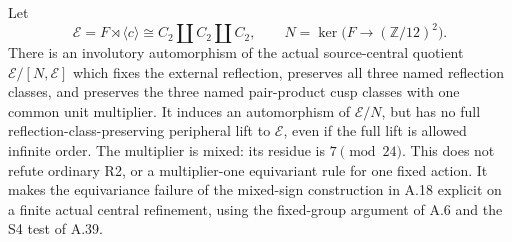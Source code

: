 Let
\[
 \mathcal E=F\rtimes\langle c\rangle
   \cong C_2\amalg C_2\amalg C_2,
 \qquad N=\ker\bigl(F\longrightarrow(\mathbb Z/12)^2\bigr).
\]
There is an involutory automorphism of the actual source-central
quotient \(\mathcal E/[N,\mathcal E]\) which fixes the external
reflection, preserves all three named reflection classes, and
preserves the three named pair-product cusp classes with one common
unit multiplier. It induces an automorphism of \(\mathcal E/N\),
but has no full reflection-class-preserving peripheral lift to
\(\mathcal E\), even if the full lift is allowed infinite order.
The multiplier is mixed: its residue is \(7\pmod {24}\).
This does not refute ordinary R2, or a multiplier-one equivariant
rule for one fixed action. It makes the equivariance failure of the
mixed-sign construction in A.18 explicit on a finite actual central
refinement, using the fixed-group argument of A.6 and the S4 test
of A.39.

